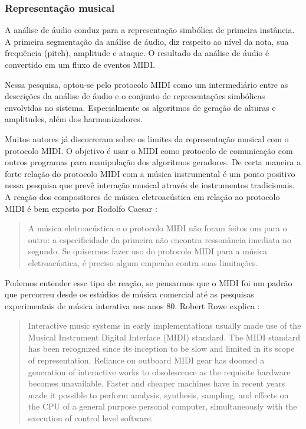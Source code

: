 \documentclass{ppgmus}
\begin{document}
 
\subsubsection{Representação musical}

A análise de áudio conduz para a representação simbólica de 
primeira instância. A primeira segmentação da análise
de áudio, diz respeito ao nível da nota, sua frequência (pitch),
amplitude e ataque. O resultado da análise de áudio é convertido
em um fluxo de eventos MIDI.

Nessa pesquisa, optou-se pelo protocolo MIDI como um intermediário
entre as descrições da análise de áudio e o conjunto de representações
simbólicas envolvidas no sistema. Especialmente os algoritmos de geração
de alturas e amplitudes, além dos harmonizadores.

Muitos autores já discorreram sobre os limites da representação musical
com o protocolo MIDI. O objetivo é usar o MIDI como protocolo de comunicação
com outros programas para manipulação dos algoritmos geradores.
De certa maneira a forte relação do protocolo MIDI com a música instrumental
é um ponto positivo nessa pesquisa que prevê interação musical através de 
instrumentos tradicionais. 
A reação dos compositores de música eletroacústica em relação ao protocolo MIDI
é bem exposto por Rodolfo Caesar \cite{caesarcopa}:

\begin{quotation}
A música eletroacústica e o protocolo MIDI não foram feitos um para o outro: a especificidade da 
primeira não encontra ressonância imediata no segundo. Se quisermos fazer uso do protocolo MIDI 
para a música eletroacústica, é preciso algum empenho contra suas limitações. 
\end{quotation}


Podemos entender esse tipo de reação, se pensarmos que o MIDI foi um padrão
que percorreu desde os estúdios de música comercial até as pesquisas experimentais
de música interativa nos anos 80. Robert Rowe explica \cite{rowe05}:

\begin{quotation}
 Interactive music systems in early implementations usually made use of the Musical
Instrument Digital Interface (MIDI) standard. The MIDI standard has been recognized since its inception
to be slow and limited in its scope of representation. Reliance on outboard MIDI gear has
doomed a generation of interactive works to obsolescence as the requisite hardware becomes unavailable.
Faster and cheaper machines have in recent years made it possible to perform analysis, synthesis,
sampling, and effects on the CPU of a general purpose personal computer, simultaneously with the
execution of control level software.
\end{quotation}
\end{document}
